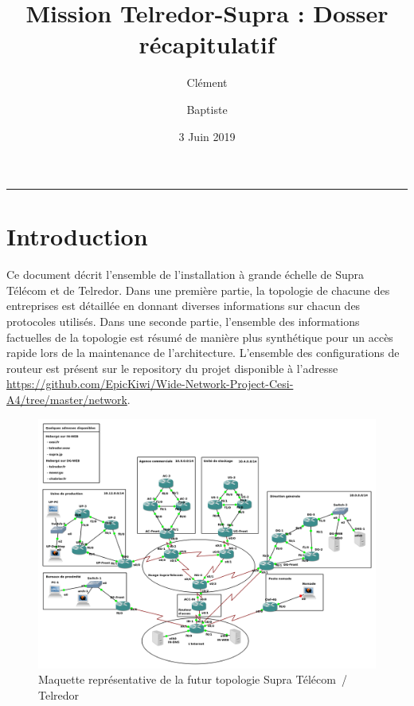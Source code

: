 \documentclass{article}
\title{Mission Telredor-Supra : Dosser récapitulatif}
\date{3 Juin 2019}
\author{Clément \bsc{Boutin} \and Baptiste \bsc{Saclier}}
\newcommand{\tlr}{Telredor\xspace}
\newcommand{\spr}{Supra Télécom\xspace}
\begin{document}
\maketitle

\begin{center}
\rule{0.5\textwidth}{0.4pt}
\end{center}

\bigskip



\bigskip

\tableofcontents

\section{Introduction}

Ce document décrit l'ensemble de l'installation à grande échelle de \spr et de \tlr. 
Dans une première partie, la topologie de chacune des entreprises est détaillée en donnant diverses informations sur chacun des protocoles utilisés.
Dans une seconde partie, l'ensemble des informations factuelles de la topologie est résumé de manière plus synthétique pour un accès rapide lors de la maintenance de l'architecture.
L'ensemble des configurations de routeur est présent sur le repository du projet disponible à l'adresse \url{https://github.com/EpicKiwi/Wide-Network-Project-Cesi-A4/tree/master/network}.

\begin{landscape}
	\begin{figure}[h]
	\begin{center}
	  \includegraphics[scale=0.55]{img/topo.png}
	\end{center}
	\caption{Maquette représentative de la futur topologie \spr\ / \tlr}
	\end{figure}
\end{landscape}
\end{document}
